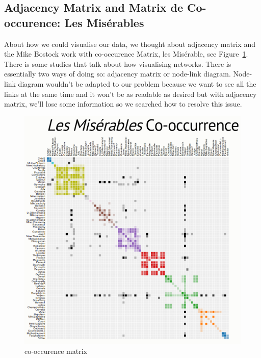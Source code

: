 \documentclass{vgtc}                          %
\begin{document}
\subsection{Adjacency Matrix and Matrix de Co-occurence: Les Misérables}
About how we could visualise our data, we thought about adjacency matrix and the Mike Bostock work with co-occurence Matrix, les Misérable\cite{Mis},
see Figure~\ref{fig:mat-co}.
There is some studies that talk about how visualising networks. There is essentially two ways of doing so: adjacency matrix or node-link diagram. Node-link diagram wouldn’t be adapted to our problem because we want to see all the links at the same time and it won’t be as readable as desired but with adjacency matrix, we’ll lose some information so we searched how to resolve this issue.
\begin{figure}[h!]
 \includegraphics[width=\columnwidth]{mat-co}
 
 \caption{co-occurence matrix}
 \label{fig:mat-co}
\end{figure} 
\end{document}
